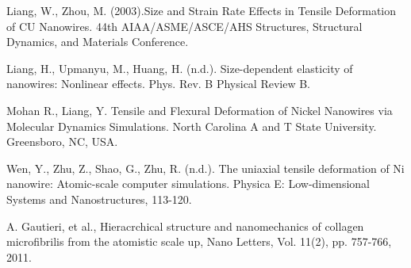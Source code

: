 \documentclass[11pt]{report}
\begin{document}
        \begin{thebibliography}{5}

Liang, W., Zhou, M. (2003).Size and Strain Rate Effects in Tensile Deformation of CU Nanowires. 44th AIAA/ASME/ASCE/AHS Structures, Structural Dynamics, and Materials Conference.

        Liang, H., Upmanyu, M.,  Huang, H. (n.d.). Size-dependent elasticity of nanowires: Nonlinear effects. Phys. Rev. B Physical Review B.

        Mohan R., Liang, Y. Tensile and Flexural Deformation of Nickel Nanowires via Molecular Dynamics Simulations. North Carolina A and T State University. Greensboro, NC, USA.

        Wen, Y., Zhu, Z., Shao, G., Zhu, R. (n.d.). The uniaxial tensile deformation of Ni nanowire: Atomic-scale computer simulations. Physica E: Low-dimensional Systems and Nanostructures, 113-120.

        A. Gautieri, et al., Hieracrchical structure and nanomechanics of collagen microfibrilis from the atomistic scale up, Nano Letters, Vol. 11(2), pp. 757-766, 2011.

        \end{thebibliography}
\end{document}
